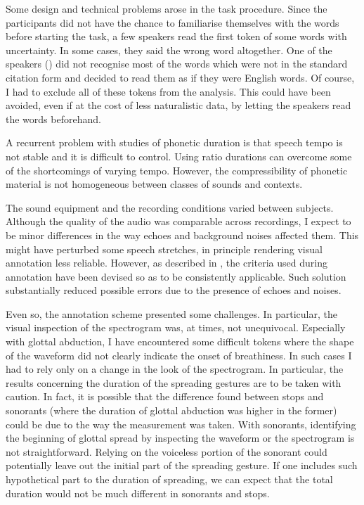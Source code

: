 \documentclass[11pt,a4paper,openany]{memoir}\usepackage[]{graphicx}\usepackage[]{color}
\begin{document}
Some design and technical problems arose in the task procedure.
Since the participants did not have the chance to familiarise themselves with the words before starting the task, a few speakers read the first token of some words with uncertainty.
In some cases, they said the wrong word altogether.
One of the speakers () did not recognise most of the words which were not in the standard citation form and decided to read them as if they were English words.
Of course, I had to exclude all of these tokens from the analysis.
This could have been avoided, even if at the cost of less naturalistic data, by letting the speakers read the words beforehand.

A recurrent problem with studies of phonetic duration is that speech tempo is not stable and it is difficult to control.
Using ratio durations can overcome some of the shortcomings of varying tempo.
However, the compressibility of phonetic material is not homogeneous between classes of sounds and contexts.

The sound equipment and the recording conditions varied between subjects.
Although the quality of the audio was comparable across recordings, I expect to be minor differences in the way echoes and background noises affected them.
This might have perturbed some speech stretches, in principle rendering visual annotation less reliable.
However, as described in , the criteria used during annotation have been devised so as to be consistently applicable.
Such solution substantially reduced possible errors due to the presence of echoes and noises.

Even so, the annotation scheme presented some challenges.
In particular, the visual inspection of the spectrogram was, at times, not unequivocal.
Especially with glottal abduction, I have encountered some difficult tokens where the shape of the waveform did not clearly indicate the onset of breathiness.
In such cases I had to rely only on a change in the look of the spectrogram.
In particular, the results concerning the duration of the spreading gestures are to be taken with caution.
In fact, it is possible that the difference found between stops and sonorants (where the duration of glottal abduction was higher in the former) could be due to the way the measurement was taken.
With sonorants, identifying the beginning of glottal spread by inspecting the waveform or the spectrogram is not straightforward.
Relying on the voiceless portion of the sonorant could potentially leave out the initial part of the spreading gesture.
If one includes such hypothetical part to the duration of spreading, we can expect that the total duration would not be much different in sonorants and stops.
\end{document}
